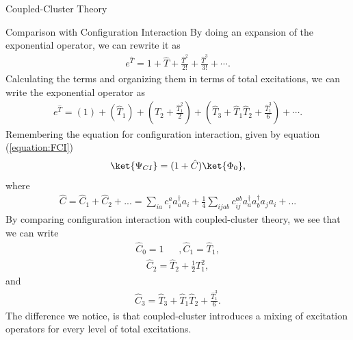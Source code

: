 \documentclass[twoside,english]{uiofysmaster}
\begin{document}
\begin{chapter}{Coupled-Cluster Theory}
	\begin{section}{Comparison with Configuration Interaction}
	  	By doing an expansion of the exponential operator, we can rewrite it as
	  	\begin{align}
	  		e^{\hat T} = 1 + \hat T + \frac{\hat T^2}{2!} + \frac{\hat T^3}{3!} + \cdots.
	  	\end{align}
	  	Calculating the terms and organizing them in terms of total excitations, we can write the exponential operator as 
	  	\begin{align}
	  		e^{\hat T} = \left( 1 \right)  + \left( \hat T_1 \right) + \left( \hat T_2 + \frac{\hat T_1^2}{2} \right) + \left( \hat T_3 + \hat T_1 \hat T_2 + \frac{\hat T_1^3}{6} \right) + \cdots .
	  	\end{align}	
	  	Remembering the equation for configuration interaction, given by equation (\ref{equation:FCI})
	  	\begin{align*}
	  		\ket{\Psi_{CI}} = (1 + \hat C) \ket{\Phi_0}, 
	   	\end{align*}
	   	where
	  	\begin{align*}
	  		\hat C = \hat C_1 + \hat C_2 + ... =  \sum_{ia} c_i^a a_a^{\dagger} a_i + \frac{1}{4} \sum_{ijab} c_{ij}^{ab} a_a^{\dagger} a_b^{\dagger} a_j a_i + ...
	   	\end{align*}
	   	By comparing configuration interaction with coupled-cluster theory, we see that we can write
	   	\begin{align}
	   		\hat C_0 = 1 \:\:\:\:\:\:\:, \hat C_1 = \hat T_1 ,
	   	\end{align}
	   	\begin{align}
	   		\hat C_2 = \hat T_2 + \frac{1}{2} T_1^2,
	   	\end{align}
	   	and 
	   	\begin{align}
	   		\hat C_3 = \hat T_3 + \hat T_1 \hat T_2 + \frac{\hat T_1^3}{6}.
	   	\end{align}
	   	The difference we notice, is that coupled-cluster introduces a mixing of excitation operators for every level of total excitations. 
 	\end{section}


\end{chapter}
\end{document}
